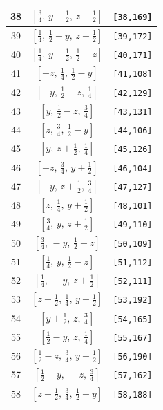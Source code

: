 \documentclass[fleqn,8pt]{jsarticle}
\begin{document}
\begin{longtable}{ccc}
38 & $\left[ \frac{3}{4},\, y + \frac{1}{2},\, z + \frac{1}{2} \right]$ & {\tt [38,169]} \\ \hline
39 & $\left[ \frac{1}{4},\, \frac{1}{2} - y,\, z + \frac{1}{2} \right]$ & {\tt [39,172]} \\ \hline
40 & $\left[ \frac{1}{4},\, y + \frac{1}{2},\, \frac{1}{2} - z \right]$ & {\tt [40,171]} \\ \hline
41 & $\left[ - z,\, \frac{1}{4},\, \frac{1}{2} - y \right]$ & {\tt [41,108]} \\ \hline
42 & $\left[ - y,\, \frac{1}{2} - z,\, \frac{1}{4} \right]$ & {\tt [42,129]} \\ \hline
43 & $\left[ y,\, \frac{1}{2} - z,\, \frac{3}{4} \right]$ & {\tt [43,131]} \\ \hline
44 & $\left[ z,\, \frac{3}{4},\, \frac{1}{2} - y \right]$ & {\tt [44,106]} \\ \hline
45 & $\left[ y,\, z + \frac{1}{2},\, \frac{1}{4} \right]$ & {\tt [45,126]} \\ \hline
46 & $\left[ - z,\, \frac{3}{4},\, y + \frac{1}{2} \right]$ & {\tt [46,104]} \\ \hline
47 & $\left[ - y,\, z + \frac{1}{2},\, \frac{3}{4} \right]$ & {\tt [47,127]} \\ \hline
48 & $\left[ z,\, \frac{1}{4},\, y + \frac{1}{2} \right]$ & {\tt [48,101]} \\ \hline
49 & $\left[ \frac{3}{4},\, y,\, z + \frac{1}{2} \right]$ & {\tt [49,110]} \\ \hline
50 & $\left[ \frac{3}{4},\, - y,\, \frac{1}{2} - z \right]$ & {\tt [50,109]} \\ \hline
51 & $\left[ \frac{1}{4},\, y,\, \frac{1}{2} - z \right]$ & {\tt [51,112]} \\ \hline
52 & $\left[ \frac{1}{4},\, - y,\, z + \frac{1}{2} \right]$ & {\tt [52,111]} \\ \hline
53 & $\left[ z + \frac{1}{2},\, \frac{1}{4},\, y + \frac{1}{2} \right]$ & {\tt [53,192]} \\ \hline
54 & $\left[ y + \frac{1}{2},\, z,\, \frac{3}{4} \right]$ & {\tt [54,165]} \\ \hline
55 & $\left[ \frac{1}{2} - y,\, z,\, \frac{1}{4} \right]$ & {\tt [55,167]} \\ \hline
56 & $\left[ \frac{1}{2} - z,\, \frac{3}{4},\, y + \frac{1}{2} \right]$ & {\tt [56,190]} \\ \hline
57 & $\left[ \frac{1}{2} - y,\, - z,\, \frac{3}{4} \right]$ & {\tt [57,162]} \\ \hline
58 & $\left[ z + \frac{1}{2},\, \frac{3}{4},\, \frac{1}{2} - y \right]$ & {\tt [58,188]} \\ \hline

\end{longtable}
\end{document}
